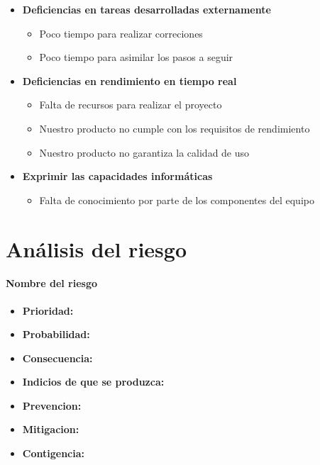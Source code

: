\documentclass[spanish,a4paper,12pt]{report}	%
\begin{document}
\begin{itemize}
\begin{itemize}
	\end{itemize}
\item \textbf {Deficiencias en tareas desarrolladas externamente}
	\begin{itemize}
		\item {Poco tiempo para realizar correciones}
		\item {Poco tiempo para asimilar los pasos a seguir}
	\end{itemize}
\item \textbf {Deficiencias en rendimiento en tiempo real}
	\begin{itemize}
		\item {Falta de recursos para realizar el proyecto}
		\item {Nuestro producto no cumple con los requisitos de rendimiento}
		\item {Nuestro producto no garantiza la calidad de uso}
	\end{itemize}
\item \textbf {Exprimir las capacidades informáticas}
	\begin{itemize}
		\item {Falta de conocimiento por parte de los componentes del equipo}
	\end{itemize}
\end{itemize}


\newpage
\mbox{}
\thispagestyle{empty}						%
\newpage

\part{Análisis del riesgo}

\subsection*{Nombre del riesgo}			%
	\begin{itemize}
		\item \textbf {Prioridad: }
		\item \textbf {Probabilidad: }
		\item \textbf {Consecuencia: }
		\item \textbf {Indicios de que se produzca: }
		\item \textbf {Prevencion: }
		\item \textbf {Mitigacion: }
		\item \textbf {Contigencia: }
	\end{itemize}
\end{document}
